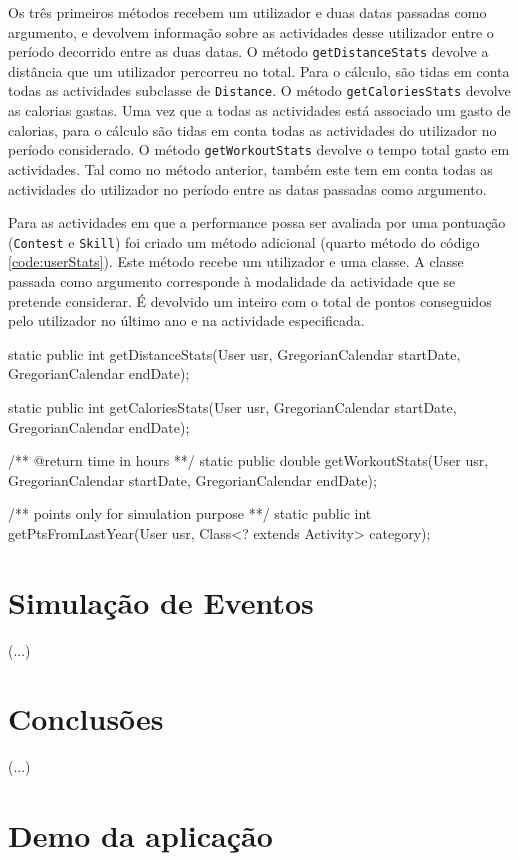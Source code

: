 \documentclass[a4paper,10pt]{report}
\begin{document}
Os três primeiros métodos recebem um utilizador e duas datas passadas como argumento, e devolvem informação sobre as actividades desse utilizador 
entre o período decorrido entre as duas datas.
O método \verb!getDistanceStats! devolve a distância que um utilizador percorreu no total. 
Para o cálculo, são tidas em conta todas as actividades subclasse de \verb!Distance!.
O método \verb!getCaloriesStats! devolve as calorias gastas. 
Uma vez que a todas as actividades está associado um gasto de calorias, para o cálculo são tidas em conta todas 
as actividades do utilizador no período considerado.
O método \verb!getWorkoutStats! devolve o tempo total gasto em actividades. 
Tal como no método anterior, também este tem em conta todas as actividades do utilizador no período entre as datas passadas como argumento.

Para as actividades em que a performance possa ser avaliada por uma pontuação (\verb!Contest! e \verb!Skill!) foi criado um método adicional 
(quarto método do código \ref{code:userStats}).
Este método recebe um utilizador e uma classe. A classe passada como argumento corresponde à modalidade da actividade que se pretende considerar. 
É devolvido um inteiro com o total de pontos conseguidos pelo utilizador no último ano e na actividade especificada.

\begin{code}[caption=Métodos para cálculo de estatísticas (src/core/UserStats)., label=code:userStats]
static public int getDistanceStats(User usr, GregorianCalendar startDate, GregorianCalendar endDate);

static public int getCaloriesStats(User usr, GregorianCalendar startDate, GregorianCalendar endDate);

/** @return time in hours **/
static public double getWorkoutStats(User usr, GregorianCalendar startDate, GregorianCalendar endDate);
  
/** points only for simulation purpose **/
static public int getPtsFromLastYear(User usr, Class<? extends Activity> category);
\end{code}



\chapter{Simulação de Eventos}
\label{cap:simula}
(...)

\chapter{Conclusões}
\label{cap:concl}
(...)




\appendix
\chapter{Demo da aplicação}
\label{anex:demo}
\end{document}

